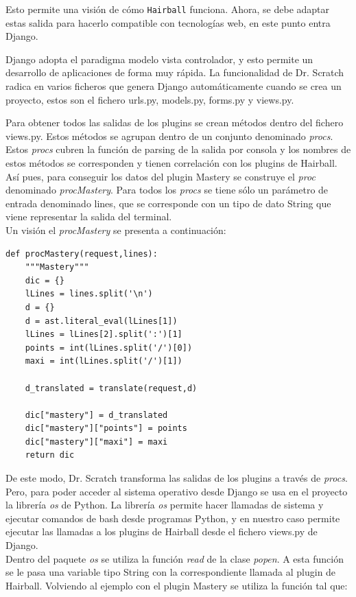 \documentclass[a4paper, 12pt]{book}
\begin{document}
Esto permite una visión de cómo \texttt{Hairball} funciona. Ahora, se debe adaptar estas
salida para hacerlo compatible con tecnologías web, en este punto entra Django. 

Django adopta el paradigma modelo vista controlador, y esto permite un desarrollo de 
aplicaciones de forma muy rápida. La funcionalidad de Dr. Scratch radica en varios 
ficheros que genera Django automáticamente cuando se crea un proyecto, estos son el
fichero urls.py, models.py, forms.py y views.py.

Para obtener todos las salidas de los plugins se crean métodos dentro del fichero views.py.
Estos métodos se agrupan dentro de un conjunto denominado \emph{procs}. Estos \emph{procs}
cubren la función de parsing de la salida por consola y los nombres de estos métodos se
corresponden y tienen correlación con los plugins de Hairball. Así pues, para conseguir 
los datos del plugin Mastery se construye el \emph{proc} denominado \emph{procMastery}. 
Para todos los \emph{procs} se tiene sólo un parámetro de entrada denominado lines, que se
corresponde con un tipo de dato String que viene representar la salida del terminal. \\

Un visión el \emph{procMastery} se presenta a continuación:
\begingroup
\fontsize{7pt}{8pt}\selectfont
\begin{verbatim}
def procMastery(request,lines):
    """Mastery"""
    dic = {}
    lLines = lines.split('\n')
    d = {}
    d = ast.literal_eval(lLines[1])
    lLines = lLines[2].split(':')[1]
    points = int(lLines.split('/')[0])
    maxi = int(lLines.split('/')[1])
    
    d_translated = translate(request,d)

    dic["mastery"] = d_translated
    dic["mastery"]["points"] = points
    dic["mastery"]["maxi"] = maxi
    return dic
\end{verbatim}
\endgroup

De este modo, Dr. Scratch transforma las salidas de los plugins a través de \emph{procs}. 
Pero, para poder acceder al sistema operativo desde Django se usa en el proyecto la
librería \emph{os} de Python. La librería \emph{os} permite hacer llamadas de sistema y
ejecutar comandos de bash desde programas Python, y en nuestro caso permite ejecutar las
llamadas a los plugins de Hairball desde el fichero views.py de Django. \\

Dentro del paquete \emph{os} se utiliza la función \emph{read} de la clase \emph{popen}.
A esta función se le pasa una variable tipo String con la correspondiente llamada al 
plugin de Hairball. Volviendo al ejemplo con el plugin Mastery se utiliza la función 
tal que: \\
\end{document}
